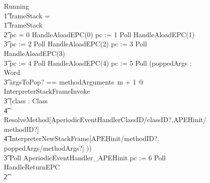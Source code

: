 \begin{figure}[t]
  \setlength{\zedindent}{0cm}
  \setlength{\zedtab}{0.3cm}
  \setlength{\zedleftsep}{0cm}
  \begin{circus}
    Running \circdef \\
    \t1 \circif frameStack = \emptyset \circthen \Skip \\
    \t1 {} \circelse frameStack \neq \emptyset \circthen {} \\
    \t2 {} \circif pc = 0 \circthen HandleAloadEPC(0) \circseq pc := 1 \circseq Poll \circseq HandleAloadEPC(1) \circseq \\
    \t3 pc := 2 \circseq Poll \circseq HandleAloadEPC(2) \circseq pc := 3 \circseq Poll \circseq HandleAloadEPC(3) \circseq \\
    \t3 pc := 4 \circseq Poll \circseq HandleAloadEPC(4) \circseq pc := 5 \circseq Poll \circseq (\circvar poppedArgs : \seq Word \circspot \\
    \t3 \lschexpract \exists argsToPop?  == methodArguments~m + 1 @ InterpreterStackFrameInvoke \rschexpract \circseq \\
    \t3 (\circvar class : Class \circspot \\
    \t4 \lschexpract ResolveMethod[AperiodicEventHandlerClassID/classID?,APEHinit/methodID?] \rschexpract \circseq \\
    \t4 \lschexpract InterpreterNewStackFrame[APEHinit/methodID?, poppedArgs/methodArgs?] \rschexpract)) \\
    \t3 Poll \circseq AperiodicEventHandler\_APEHinit \circseq pc := 6 \circseq Poll \circseq HandleReturnEPC \\
    \t2 {} \cdots {} \\

\end{circus}
\end{figure}
